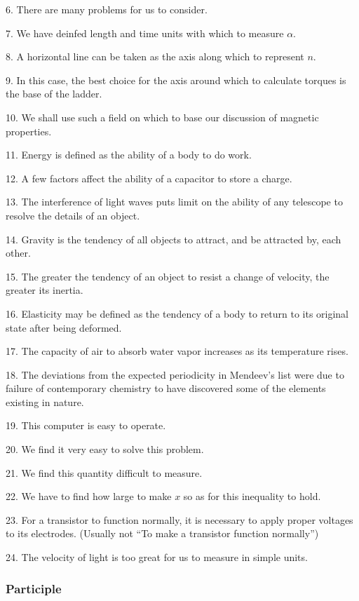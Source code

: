 \documentclass[a4paper,twocolumn,10pt]{article}
\begin{document}
\begin{CJK}{UTF8}{gkai}
	6. There are many problems for us to consider.

	7. We have deinfed length and time units with which to measure $\alpha$.

	8. A horizontal line can be taken as the axis along which to represent $n$.

	9. In this case, the best choice for the axis around which to calculate torques is the base of the ladder.

	10. We shall use such a field on which to base our discussion of magnetic properties.

	11. Energy is defined as the ability of a body to do work.

	12. A few factors affect the ability of a capacitor to store a charge.

	13. The interference of light waves puts limit on the ability of any telescope to resolve
	the details of an object.

	14. Gravity is the tendency of all objects to attract, and be attracted by, each other.

	15. The greater the tendency of an object to resist a change of velocity, the greater its inertia.

	16. Elasticity may be defined as the tendency of a body to return to its original state after being deformed.

	17. The capacity of air to absorb water vapor increases as its temperature rises.

	18. The deviations from the expected periodicity in Mendeev's list were due to
	failure of contemporary chemistry to have discovered some of the elements existing in nature.

	19. This computer is easy to operate.

	20. We find it very easy to solve this problem.

	21. We find this quantity difficult to measure.

	22. We have to find how large to make $x$ so as for this inequality to hold.

	23. For a transistor to function normally, it is necessary to apply proper voltages to its electrodes.
	(Usually not ``To make a transistor function normally'')

	24. The velocity of light is too great for us to measure in simple units.

	\subsubsection{Participle}


\end{CJK}
\end{document}
